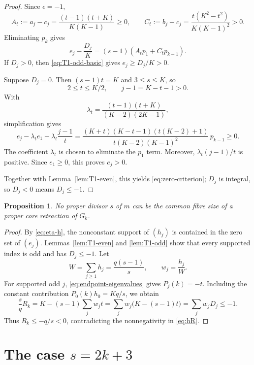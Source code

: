 \documentclass[11pt]{article}
\theoremstyle{plain}
\newtheorem{proposition}[theorem]{Proposition}
\theoremstyle{remark}
\begin{document}
\begin{proof}
Since $\epsilon=-1$,
\begin{equation}\label{eq:AB}
 A_t:=a_j-c_j=\frac{(t-1)(t+K)}{K(K-1)}\ge0,\qquad
 C_t:=b_j-c_j=\frac{t(K^2-t^2)}{K(K-1)^2}>0.
\end{equation}
Eliminating $p_k$ gives
\begin{equation}\label{eq:T1-odd-basic}
 e_j-\frac{D_j}{K}=(s-1)(A_tp_1+C_tp_{k-1}).
\end{equation}
If $D_j>0$, then \eqref{eq:T1-odd-basic} gives
$e_j\ge D_j/K>0$.
\begin{samepage}
Suppose $D_j=0$.  Then
$(s-1)t=K$ and $3\le s\le K$, so
\[
 2\le t\le K/2,\qquad j-1=K-t-1>0.
\]
With
\[
 \lambda_t=\frac{(t-1)(t+K)}{(K-2)(2K-1)},
\]
simplification gives
\begin{equation}\label{eq:T1-D0}
 e_j-\lambda_t e_1-\lambda_t\frac{j-1}{t}
 =\frac{(K+t)(K-t-1)(t(K-2)+1)}
 {t(K-2)(K-1)^2}\,p_{k-1}\ge0.
\end{equation}
The coefficient $\lambda_t$ is chosen to eliminate the $p_1$ term.
Moreover, $\lambda_t(j-1)/t$ is positive.  Since $e_1\ge0$, this
proves $e_j>0$.
\end{samepage}
Together with Lemma~\ref{lem:T1-even}, this yields
\eqref{eq:zero-criterion}; $D_j$ is integral, so $D_j<0$ means
$D_j\le-1$.
\end{proof}

\begin{proposition}\label{prop:proper-impossible}
No proper divisor $s$ of $m$ can be the common fibre size of a proper core
retraction of $G_k$.
\end{proposition}

\begin{proof}
By \eqref{eq:eta-h}, the nonconstant support of $(h_j)$ is contained in
the zero set of $(e_j)$.  Lemmas~\ref{lem:T1-even} and
\ref{lem:T1-odd} show that every supported index is odd and has
$D_j\le-1$.  Let
\[
 W=\sum_{j\ge1}h_j=\frac{q(s-1)}s,\qquad w_j=\frac{h_j}{W}.
\]
For supported odd $j$, \eqref{eq:endpoint-eigenvalues} gives
$P_j(k)=-t$.  Including the constant contribution
$P_0(k)h_0=Kq/s$, we obtain
\begin{equation}\label{eq:Rk-separation}
 \frac{s}{q}R_k
 =K-(s-1)\sum_jw_jt
 =\sum_jw_j\bigl(K-(s-1)t\bigr)
 =\sum_jw_jD_j\le-1.
\end{equation}
Thus $R_k\le-q/s<0$, contradicting the nonnegativity in
\eqref{eq:hR}.
\end{proof}

\section{The case \texorpdfstring{$s=2k+3$}{s=2k+3}}\label{sec:full}
\end{document}
